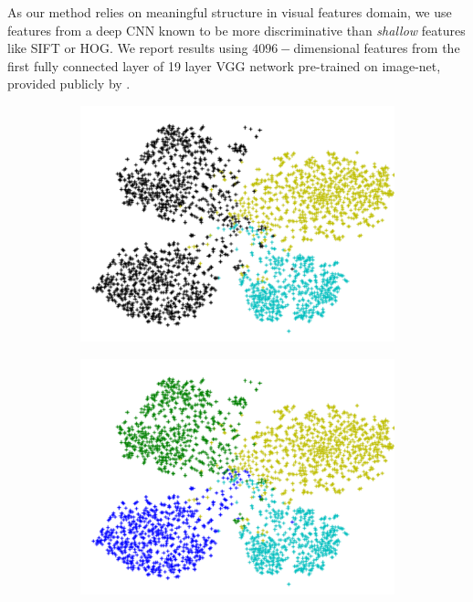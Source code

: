 \documentclass[10pt,twocolumn,letterpaper]{article}
\begin{document}
As our method relies on meaningful structure in visual features domain, we use features from a deep CNN known to be
 more discriminative than \textit{shallow} features like SIFT or HOG. We report results using
  $4096-$dimensional features from the first fully connected layer of 19 layer VGG network \cite{vgg}
pre-trained on image-net, provided publicly by \cite{sse}.
\begin{figure}[t]
  \centering
  \begin{subfigure}[b]{0.25\linewidth}
    \includegraphics[width=\linewidth]{none}
    \caption{}
    \label{fig:null}
  \end{subfigure}
%
  \begin{subfigure}[b]{0.25\linewidth}
    \includegraphics[width=\linewidth]{truth}

\end{subfigure}
\end{figure}
\end{document}
